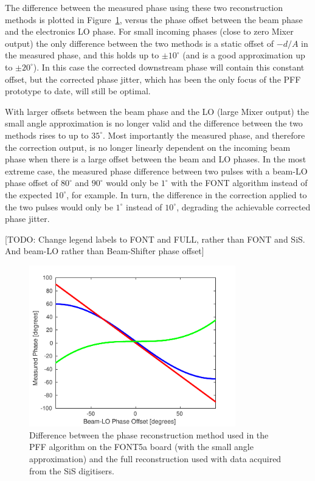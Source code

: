 The difference between the measured phase using these two reconstruction methods is plotted in Figure~\ref{f:phaseRecDiff}, versus the phase offset between the beam phase and the electronics LO phase. For small incoming phases (close to zero Mixer output) the only difference between the two methods is a static offset of \(-d/A\) in the measured phase, and this holds up to \(\pm10^\circ\) (and is a good approximation up to \(\pm20^\circ\)). In this case the corrected downstream phase will contain this constant offset, but the corrected phase jitter, which has been the only focus of the PFF prototype to date, will still be optimal. 

With larger offsets between the beam phase and the LO (large Mixer output) the small angle approximation is no longer valid and the difference between the two methods rises to up to \(35^\circ\). Most importantly the measured phase, and therefore the correction output, is no longer linearly dependent on the incoming beam phase when there is a large offset between the beam and LO phases. In the most extreme case, the measured phase difference between two pulses with a beam-LO phase offset of \(80^\circ\) and \(90^\circ\) would only be \(1^\circ\) with the FONT algorithm instead of the expected \(10^\circ\), for example. In turn, the difference in the correction applied to the two pulses would only be \(1^\circ\) instead of \(10^\circ\), degrading the achievable corrected phase jitter.

[TODO: Change legend labels to FONT and FULL, rather than FONT and SiS. And beam-LO rather than Beam-Shifter phase offset]

\begin{figure}
  \centering
  \includegraphics[width=0.8\textwidth]{Figures/commissioning/phaseRecDiff}
  \caption{Difference between the phase reconstruction method used in the PFF algorithm on the FONT5a board (with the small angle approximation) and the full reconstruction used with data acquired from the SiS digitisers.}
  \label{f:phaseRecDiff}
\end{figure}

